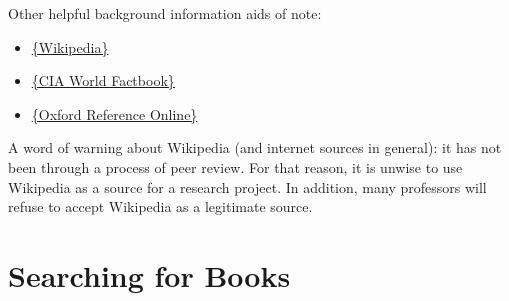 Other helpful background information aids of note:

\begin{itemize}
\item \href{http://www.wikipedia.org}{\{Wikipedia\}}

\item \href{http://www.cia.gov/library/publications/the-world-factbook/}{\{CIA 
World Factbook\}}

\item \href{[http://www.oxfordreference.com.ezproxy.bu.edu}{\{Oxford Reference 
Online\}}

\end{itemize}
A word of warning about Wikipedia (and internet sources in general): it has not 
been through a process of peer review. For that reason, it is unwise to use 
Wikipedia as a source for a research project. In addition, many professors will 
refuse to accept Wikipedia as a legitimate source. 

\section{Searching for Books}

